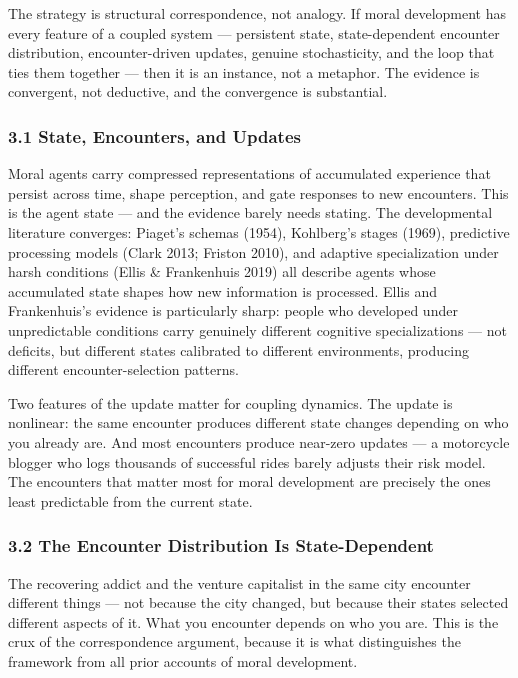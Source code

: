 \documentclass[
]{article}
\begin{document}
The strategy is structural correspondence, not analogy. If moral
development has every feature of a coupled system --- persistent state,
state-dependent encounter distribution, encounter-driven updates,
genuine stochasticity, and the loop that ties them together --- then it
is an instance, not a metaphor. The evidence is convergent, not
deductive, and the convergence is substantial.

\subsubsection{3.1 State, Encounters, and
Updates}\label{state-encounters-and-updates}

Moral agents carry compressed representations of accumulated experience
that persist across time, shape perception, and gate responses to new
encounters. This is the agent state --- and the evidence barely needs
stating. The developmental literature converges: Piaget's schemas
(1954), Kohlberg's stages (1969), predictive processing models (Clark
2013; Friston 2010), and adaptive specialization under harsh conditions
(Ellis \& Frankenhuis 2019) all describe agents whose accumulated state
shapes how new information is processed. Ellis and Frankenhuis's
evidence is particularly sharp: people who developed under unpredictable
conditions carry genuinely different cognitive specializations --- not
deficits, but different states calibrated to different environments,
producing different encounter-selection patterns.

Two features of the update matter for coupling dynamics. The update is
nonlinear: the same encounter produces different state changes depending
on who you already are. And most encounters produce near-zero updates
--- a motorcycle blogger who logs thousands of successful rides barely
adjusts their risk model. The encounters that matter most for moral
development are precisely the ones least predictable from the current
state.

\subsubsection{3.2 The Encounter Distribution Is
State-Dependent}\label{the-encounter-distribution-is-state-dependent}

The recovering addict and the venture capitalist in the same city
encounter different things --- not because the city changed, but because
their states selected different aspects of it. What you encounter
depends on who you are. This is the crux of the correspondence argument,
because it is what distinguishes the framework from all prior accounts
of moral development.
\end{document}
